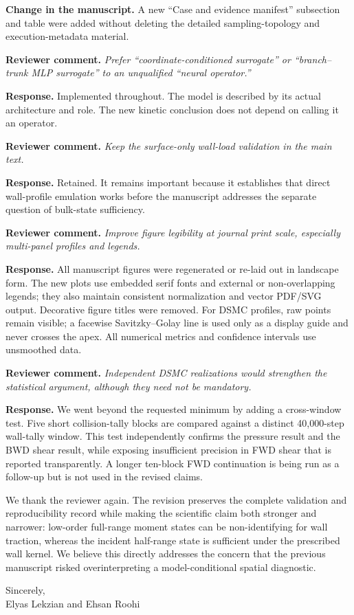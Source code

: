 \documentclass[11pt]{article}
\newcommand{\reviewer}[1]{\vspace{0.4em}\noindent\textbf{Reviewer comment.} \emph{#1}}
\newcommand{\response}{\noindent\textbf{Response.} }
\newcommand{\change}{\noindent\textbf{Change in the manuscript.} }
\begin{document}
\change A new ``Case and evidence manifest'' subsection and table were added without deleting the detailed sampling-topology and execution-metadata material.

\reviewer{Prefer ``coordinate-conditioned surrogate'' or ``branch--trunk MLP surrogate'' to an unqualified ``neural operator.''}

\response Implemented throughout. The model is described by its actual architecture and role. The new kinetic conclusion does not depend on calling it an operator.

\reviewer{Keep the surface-only wall-load validation in the main text.}

\response Retained. It remains important because it establishes that direct wall-profile emulation works before the manuscript addresses the separate question of bulk-state sufficiency.

\reviewer{Improve figure legibility at journal print scale, especially multi-panel profiles and legends.}

\response All manuscript figures were regenerated or re-laid out in landscape form. The new plots use embedded serif fonts and external or non-overlapping legends; they also maintain consistent normalization and vector PDF/SVG output. Decorative figure titles were removed. For DSMC profiles, raw points remain visible; a facewise Savitzky--Golay line is used only as a display guide and never crosses the apex. All numerical metrics and confidence intervals use unsmoothed data.

\reviewer{Independent DSMC realizations would strengthen the statistical argument, although they need not be mandatory.}

\response We went beyond the requested minimum by adding a cross-window test. Five short collision-tally blocks are compared against a distinct 40,000-step wall-tally window. This test independently confirms the pressure result and the BWD shear result, while exposing insufficient precision in FWD shear that is reported transparently. A longer ten-block FWD continuation is being run as a follow-up but is not used in the revised claims.

\vspace{0.4em}
We thank the reviewer again. The revision preserves the complete validation and reproducibility record while making the scientific claim both stronger and narrower: low-order full-range moment states can be non-identifying for wall traction, whereas the incident half-range state is sufficient under the prescribed wall kernel. We believe this directly addresses the concern that the previous manuscript risked overinterpreting a model-conditional spatial diagnostic.

Sincerely,\\
Elyas Lekzian and Ehsan Roohi
\end{document}
